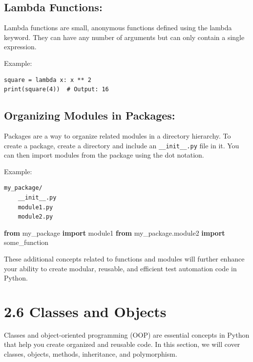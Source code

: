 \documentclass[
  paper=a4,
  ,captions=tableheading
]{scrartcl}
\newenvironment{Shaded}{}{}
\newcommand{\ImportTok}[1]{\textcolor[rgb]{0.00,0.50,0.00}{\textbf{#1}}}
\newcommand{\NormalTok}[1]{#1}
\begin{document}
\hypertarget{lambda-functions}{%
\subsection{Lambda Functions:}\label{lambda-functions}}

Lambda functions are small, anonymous functions defined using the lambda
keyword. They can have any number of arguments but can only contain a
single expression.

Example:

\begin{verbatim}
square = lambda x: x ** 2
print(square(4))  # Output: 16
\end{verbatim}

\hypertarget{organizing-modules-in-packages}{%
\subsection{Organizing Modules in
Packages:}\label{organizing-modules-in-packages}}

Packages are a way to organize related modules in a directory hierarchy.
To create a package, create a directory and include an
\texttt{\_\_init\_\_.py} file in it. You can then import modules from
the package using the dot notation.

Example:

\begin{verbatim}
my_package/
    __init__.py
    module1.py
    module2.py
\end{verbatim}

\begin{Shaded}
\begin{Highlighting}[]
\ImportTok{from}\NormalTok{ my\_package }\ImportTok{import}\NormalTok{ module1}
\ImportTok{from}\NormalTok{ my\_package.module2 }\ImportTok{import}\NormalTok{ some\_function}
\end{Highlighting}
\end{Shaded}

These additional concepts related to functions and modules will further
enhance your ability to create modular, reusable, and efficient test
automation code in Python.

\hypertarget{classes-and-objects}{%
\section{2.6 Classes and Objects}\label{classes-and-objects}}

Classes and object-oriented programming (OOP) are essential concepts in
Python that help you create organized and reusable code. In this
section, we will cover classes, objects, methods, inheritance, and
polymorphism.
\end{document}
